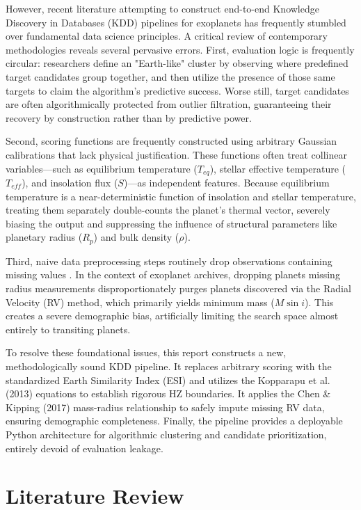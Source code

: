 \documentclass[conference]{IEEEtran}
\begin{document}
However, recent literature attempting to construct end-to-end Knowledge Discovery in Databases (KDD) pipelines for exoplanets has frequently stumbled over fundamental data science principles. A critical review of contemporary methodologies reveals several pervasive errors. First, evaluation logic is frequently circular: researchers define an "Earth-like" cluster by observing where predefined target candidates group together, and then utilize the presence of those same targets to claim the algorithm's predictive success. Worse still, target candidates are often algorithmically protected from outlier filtration, guaranteeing their recovery by construction rather than by predictive power.

Second, scoring functions are frequently constructed using arbitrary Gaussian calibrations that lack physical justification. These functions often treat collinear variables---such as equilibrium temperature ($T_{eq}$), stellar effective temperature ($T_{eff}$), and insolation flux ($S$)---as independent features. Because equilibrium temperature is a near-deterministic function of insolation and stellar temperature, treating them separately double-counts the planet's thermal vector, severely biasing the output and suppressing the influence of structural parameters like planetary radius ($R_p$) and bulk density ($\rho$).

Third, naive data preprocessing steps routinely drop observations containing missing values \cite{lalande2024}. In the context of exoplanet archives, dropping planets missing radius measurements disproportionately purges planets discovered via the Radial Velocity (RV) method, which primarily yields minimum mass ($M \sin i$). This creates a severe demographic bias, artificially limiting the search space almost entirely to transiting planets.

To resolve these foundational issues, this report constructs a new, methodologically sound KDD pipeline. It replaces arbitrary scoring with the standardized Earth Similarity Index (ESI) \cite{EarthSimilarityIndex} and utilizes the Kopparapu et al. (2013) equations to establish rigorous HZ boundaries. It applies the Chen \& Kipping (2017) mass-radius relationship to safely impute missing RV data, ensuring demographic completeness. Finally, the pipeline provides a deployable Python architecture for algorithmic clustering and candidate prioritization, entirely devoid of evaluation leakage.

\section{Literature Review}
\end{document}
